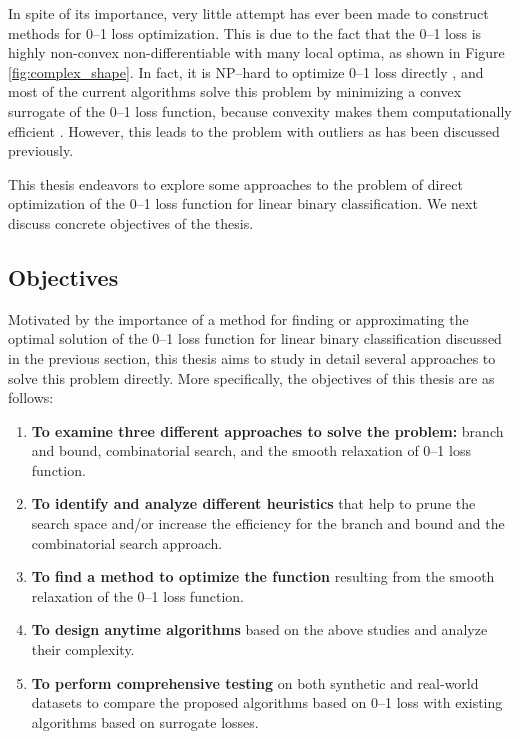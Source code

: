 In spite of its importance, very little attempt has ever been made to construct methods for 0--1 loss optimization. This is due to the fact that the 0--1 loss is highly non-convex non-differentiable with many local optima, as shown in Figure \ref{fig:complex_shape}. In fact, it is NP--hard to optimize 0--1 loss directly \cite{Feldman,nphard}, and most of the current algorithms solve this problem by minimizing a convex surrogate of the 0--1 loss function, because convexity makes them computationally efficient \cite{Bartlett}. However, this leads to the problem with outliers as has been discussed previously. 

This thesis endeavors to explore some approaches to the problem of direct optimization of the 0--1 loss function for linear binary classification. We next discuss concrete objectives of the thesis.


\subsection{Objectives}
\label{sec:intro.objectives}

Motivated by the importance of a method for finding or approximating the optimal solution of the 0--1 loss function for linear binary classification discussed in the previous section, this thesis aims to study in detail several approaches to solve this problem directly. More specifically, the objectives of this thesis are as follows:

\begin{enumerate}[ (i)]

\item {\bf To examine three different approaches to solve the problem:}  branch and bound, combinatorial search, and the smooth relaxation of 0--1 loss function.

\item {\bf To identify and analyze different heuristics} that help to prune the search space and/or increase the efficiency for the branch and bound and the combinatorial search approach. 

\item {\bf To find a method to optimize the function} resulting from the smooth relaxation of the 0--1 loss function. 

\item {\bf To design anytime algorithms} based on the above studies and analyze their complexity. 

\item {\bf To perform comprehensive testing} on both synthetic and real-world datasets to compare the proposed algorithms based on 0--1 loss with existing algorithms based on surrogate losses. 
 
\end{enumerate}



